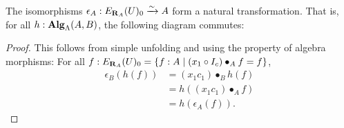 \begin{lemma}
  The isomorphisms $ \epsilon_A : E_{\mathbf{R}_A}(U)_0 \xrightarrow \sim A $ form a natural transformation. That is, for all $ h: \mathbf{Alg}_{\Lambda}(A, B) $, the following diagram commutes:
  \begin{center}
  \end{center}
\end{lemma}
\begin{proof}
  This follows from simple unfolding and using the property of algebra morphisms: For all $ f: E_{\mathbf{R}_A}(U)_0 = \{ f : A \mid (x_1 \circ I_c) \bullet_A f = f \} $,
  \begin{align*}
    \epsilon_B(h(f))
    &= (x_1 c_1) \bullet_B h(f)\\
    &= h((x_1 c_1) \bullet_A f)\\
    &= h(\epsilon_A(f)).
  \end{align*}
\end{proof}

